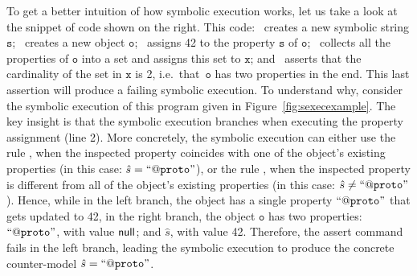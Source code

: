 To get a better intuition of how symbolic execution works, let us take a look at the snippet of code shown on the right. 
This code: 
        ~creates a new symbolic string $\mathtt{s}$;
	~creates a new object $\mathtt{o}$;
	~assigns 42 to the property $\mathtt{s}$ of $\mathtt{o}$; 
	~collects all the properties of $\mathtt{o}$ into a set and assigns this set to $\mathtt{x}$; and
	~asserts that the cardinality of the set in $\mathtt{x}$ is 2, i.e.~that~$\mathtt{o}$ has two properties in the end. 
	     This last assertion will produce a failing symbolic execution.
%
To understand why, consider the symbolic execution of this program given in Figure~\ref{fig:sexecexample}.
%
The key insight is that the symbolic execution branches when executing the property assignment (line 2).
% 
More concretely, the symbolic execution can either use the rule , when 
the inspected property coincides with one of the object's existing properties (in this case: $\hat{s} = \mathtt{``@proto"}$), 
or the rule , when the inspected property is different from all of the 
object's existing properties (in this case: $\hat{s} \neq \mathtt{``@proto"}$). 
%
Hence, while in the left branch,  the object has a single property $\mathtt{``@proto"}$ that gets updated to 42,
in the right branch, the object $\mathtt{o}$ has two properties: $ \mathtt{``@proto"}$, with value ${\sf null}$; and 
$\hat{s}$, with value 42. 
%
Therefore, the assert command fails in the left branch, leading the symbolic execution to produce the concrete counter-model 
$\hat{s} = \mathtt{``@proto"}$.

